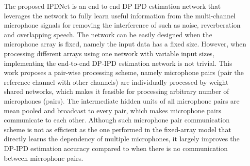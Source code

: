 \documentclass[lettersize,journal]{IEEEtran}
\begin{document}
The proposed IPDNet is an end-to-end DP-IPD estimation network that leverages the network to fully learn useful information from the multi-channel microphone signals for removing the interference of such as noise, reverberation and overlapping speech. The network can be easily designed when the microphone array is fixed, namely the input data has a fixed size. However, when processing different arrays using one network with variable input sizes, implementing the end-to-end DP-IPD estimation network is not trivial. This work proposes a pair-wise processing scheme, namely microphone pairs (pair the reference channel with other channels) are individually processed by weight-shared networks, which makes it feasible for processing arbitrary number of microphones (pairs). The intermediate hidden units of all microphone pairs are mean pooled and broadcast to every pair, which makes microphone pairs communicate to each other. Although such microphone pair communication scheme is not as efficient as the one performed in the fixed-array model that directly learns the dependency of multiple microphones, it largely improves the DP-IPD estimation accuracy compared to when there is no communication between microphone pairs. 


\end{document}
